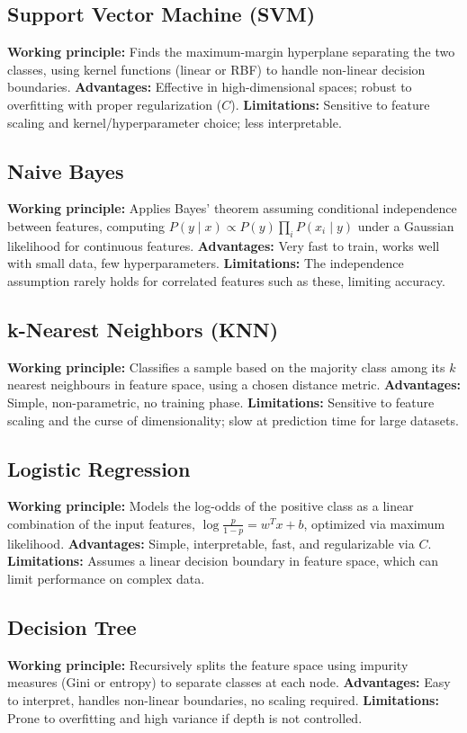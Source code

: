 \documentclass[12pt,a4paper]{article}
\begin{document}
\subsection*{Support Vector Machine (SVM)}
\textbf{Working principle:} Finds the maximum-margin hyperplane separating the two classes, using kernel functions (linear or RBF) to handle non-linear decision boundaries.
\textbf{Advantages:} Effective in high-dimensional spaces; robust to overfitting with proper regularization ($C$).
\textbf{Limitations:} Sensitive to feature scaling and kernel/hyperparameter choice; less interpretable.

\subsection*{Naive Bayes}
\textbf{Working principle:} Applies Bayes' theorem assuming conditional independence between features, computing $P(y\mid x) \propto P(y)\prod_i P(x_i\mid y)$ under a Gaussian likelihood for continuous features.
\textbf{Advantages:} Very fast to train, works well with small data, few hyperparameters.
\textbf{Limitations:} The independence assumption rarely holds for correlated features such as these, limiting accuracy.

\subsection*{k-Nearest Neighbors (KNN)}
\textbf{Working principle:} Classifies a sample based on the majority class among its $k$ nearest neighbours in feature space, using a chosen distance metric.
\textbf{Advantages:} Simple, non-parametric, no training phase.
\textbf{Limitations:} Sensitive to feature scaling and the curse of dimensionality; slow at prediction time for large datasets.

\subsection*{Logistic Regression}
\textbf{Working principle:} Models the log-odds of the positive class as a linear combination of the input features, $\log\frac{p}{1-p} = w^Tx+b$, optimized via maximum likelihood.
\textbf{Advantages:} Simple, interpretable, fast, and regularizable via $C$.
\textbf{Limitations:} Assumes a linear decision boundary in feature space, which can limit performance on complex data.

\subsection*{Decision Tree}
\textbf{Working principle:} Recursively splits the feature space using impurity measures (Gini or entropy) to separate classes at each node.
\textbf{Advantages:} Easy to interpret, handles non-linear boundaries, no scaling required.
\textbf{Limitations:} Prone to overfitting and high variance if depth is not controlled.
\end{document}

